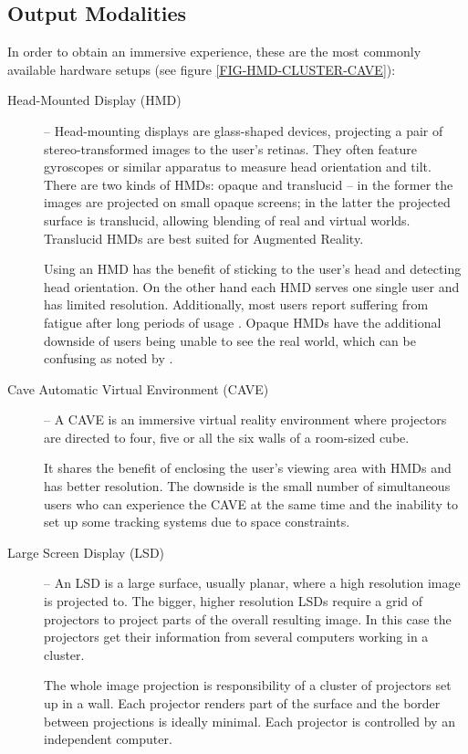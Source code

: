 \subsection{Output Modalities}

In order to obtain an immersive experience, these are the most commonly available hardware setups (see figure \ref{FIG-HMD-CLUSTER-CAVE}):

\begin{description}
	\item[Head-Mounted Display (HMD)] --
	  Head-mounting displays are glass-shaped devices, projecting a pair of stereo-transformed images
	  to the user's retinas.
	  They often feature gyroscopes or similar apparatus to measure head orientation and tilt.
	  There are two kinds of HMDs: opaque and translucid --
	  in the former the images are projected on small opaque screens;
	  in the latter the projected surface is translucid, allowing blending of real and virtual worlds.
	  Translucid HMDs are best suited for Augmented Reality.
	  
		Using an HMD has the benefit of sticking to the user's head and detecting head orientation.
		On the other hand each HMD serves one single user and has limited resolution.
		Additionally, most users report suffering from fatigue after long periods of
		usage \cite{VREDUC}.
		Opaque HMDs have the additional downside of users being unable to see the real world, 
		which can be confusing as noted by \cite{VANDERPOL}.
			
	\item[Cave Automatic Virtual Environment (CAVE)] --
	  A CAVE is an immersive virtual reality environment where projectors are directed to four,
	  five or all the six walls of a room-sized cube.
	  
		It shares the benefit of enclosing the user's viewing area with HMDs and has better resolution.
		The downside is the small number of simultaneous users who can experience the CAVE at the same time
		and the inability to set up some tracking systems due to space constraints.
	
	\item[Large Screen Display (LSD)] --
	  An LSD is a large surface, usually planar, where a high resolution image is projected to.
	  The bigger, higher resolution LSDs require a grid of projectors to project parts of the overall resulting image.
	  In this case the projectors get their information from several computers working in a cluster.
	  
	  The whole image projection is responsibility of a cluster of projectors set up in a wall.
	  Each projector renders part of the surface and the border between projections is ideally minimal.
	  Each projector is controlled by an independent computer.
	  

\end{description}
